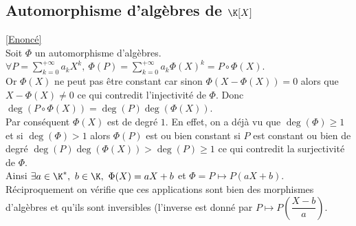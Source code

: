 \documentclass[8pt]{book}
\begin{document}
	\subsection{Automorphisme d'algèbres de $\K[X]$}
	\label{Automorphisme d'algèbres des polynômes corrigé}
	\textcolor{blue}{\hyperref[Automorphisme d'algèbres des polynômes]{[Enoncé]}}\\
	Soit $\Phi$ un automorphisme d'algèbres.\\
	$\forall P=\displaystyle\sum_{k=0}^{+\infty}a_kX^k,\ \Phi(P)=\sum_{k=0}^{+\infty}a_k\Phi(X)^k=P\circ \Phi(X)$.\\
	Or $\Phi(X)$ ne peut pas être constant car sinon $\Phi(X-\Phi(X))=0$ alors que $X-\Phi(X)\ne 0$ ce qui contredit l'injectivité de $\Phi$. Donc $\deg(P\circ \Phi(X))=\deg(P)\deg(\Phi(X))$.\\
	Par conséquent $\Phi(X)$ est de degré $1$. En effet, on a déjà vu que $\deg(\Phi)\geq 1$ et si $\deg(\Phi)>1$ alors $\Phi(P)$ est ou bien constant si $P$ est constant ou bien de degré $\deg(P)\deg(\Phi(X))>\deg(P)\geq 1$ ce qui contredit la surjectivité de $\Phi$.\\
	Ainsi $\exists a\in \K^*,\ b\in \K,\ \Phi(X)=aX+b$ et $\Phi=P\mapsto P(aX+b)$.\\
	Réciproquement on vérifie que ces applications sont bien des morphismes d'algèbres et qu'ils sont inversibles (l'inverse est donné par $P\mapsto P\left(\dfrac{X-b}{a}\right)$.
	
\end{document}

